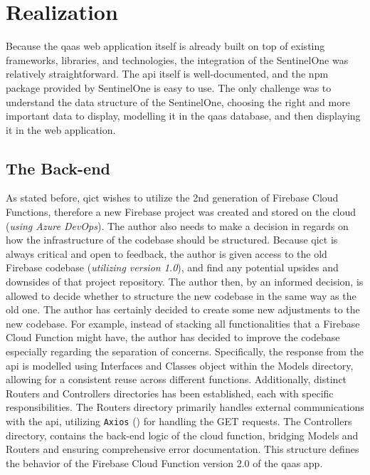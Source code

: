 \chapter{Realization}

\begin{multicols}{2}
  Because the \acrshort{qaas} web application itself is already built on top of existing frameworks, libraries, and technologies, the
  integration of the SentinelOne was relatively straightforward. The \acrshort{api} itself is well-documented, and the \acrshort{npm}
  package provided by SentinelOne is easy to use. The only challenge was to understand the data structure of the SentinelOne, choosing
  the right and more important data to display, modelling it in the \acrshort{qaas} database, and then
  displaying it in the web application.

  \section{The Back-end}

  As stated before, \acrshort{qict} wishes to utilize the 2nd generation of Firebase Cloud Functions, therefore a new Firebase project
  was created and stored on the cloud (\textit{using Azure DevOps}). The author also needs to make a decision in regards on how the
  infrastructure of the codebase should be structured. Because \acrshort{qict} is always critical and open to feedback, the author is
  given access to the old Firebase codebase (\textit{utilizing version 1.0}), and find any potential upsides and downsides of that
  project repository. The author then, by an informed decision, is allowed to decide whether to structure the new codebase in the same
  way as the old one. The author has certainly decided to create some new adjustments to the new codebase. For example, instead of
  stacking all functionalities that a Firebase Cloud Function might have, the author has decided to improve the codebase especially
  regarding the separation of concerns. Specifically, the response from the \acrshort{api} is modelled using Interfaces and Classes
  object within the Models directory, allowing for a consistent reuse across different functions. Additionally, distinct Routers
  and Controllers directories has been established, each with specific responsibilities. The Routers directory primarily handles
  external communications with the \acrshort{api}, utilizing \texttt{Axios} (\textit{\cite{axiosNpm}}) for handling the GET requests.
  The Controllers directory, contains the back-end logic of the cloud function, bridging Models and Routers and ensuring comprehensive
  error documentation. This structure defines the behavior of the Firebase Cloud Function version 2.0 of the \acrshort{qaas} app.


\end{multicols}
